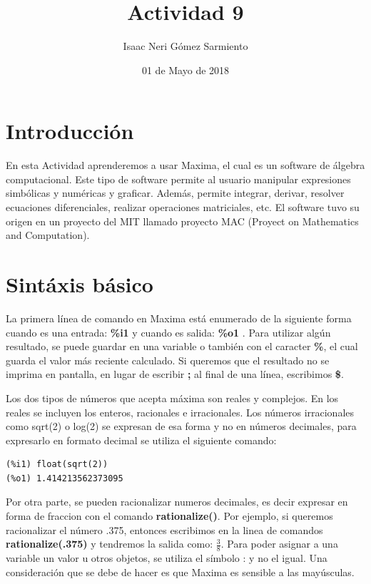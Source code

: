\documentclass[a4paper]{article}
\title{Actividad 9}
\author{Isaac Neri Gómez Sarmiento}
\date{01 de Mayo de 2018}
\begin{document}
\maketitle


\section{Introducción}
En esta Actividad aprenderemos a usar Maxima, el cual es un software de álgebra computacional.
Este tipo de software permite al usuario manipular expresiones simbólicas y numéricas y graficar.
Además, permite integrar, derivar, resolver ecuaciones diferenciales, realizar operaciones matriciales,
etc.
El software tuvo su origen en un proyecto del MIT llamado proyecto MAC (Proyect on Mathematics
and Computation).

\section{Sintáxis básico}

La primera línea de comando en Maxima está enumerado de la siguiente forma cuando es una entrada: \textbf{\%i1 } y cuando
es salida: \textbf{\%o1 }.
Para utilizar algún resultado, se puede guardar en una variable o también con el caracter \textbf{\%},
el cual guarda el valor más reciente calculado.
Si queremos que el resultado no se imprima en pantalla, en lugar de escribir \textbf{;} al final de una línea, escribimos \textbf{\$}.

Los dos tipos de números que acepta máxima son reales y complejos. En los reales se incluyen
los enteros, racionales e irracionales. Los números irracionales como sqrt(2) o log(2) se expresan
de esa forma y no en números decimales, para expresarlo en formato decimal se utiliza el siguiente
comando:

\begin{verbatim}
(%i1) float(sqrt(2))
(%o1) 1.414213562373095
\end{verbatim}


Por otra parte, se pueden racionalizar numeros decimales, es decir expresar en forma de fraccion
con el comando \textbf{rationalize()}. Por ejemplo, si queremos racionalizar el número .375, entonces
escribimos en la linea de comandos \textbf{rationalize(.375)} y tendremos la salida como: $\frac{3}{8}$.
Para poder asignar a una variable un valor u otros objetos, se utiliza el símbolo : y no el igual.
Una consideración que se debe de hacer es que Maxima es sensible a las mayúsculas.
\end{document}
